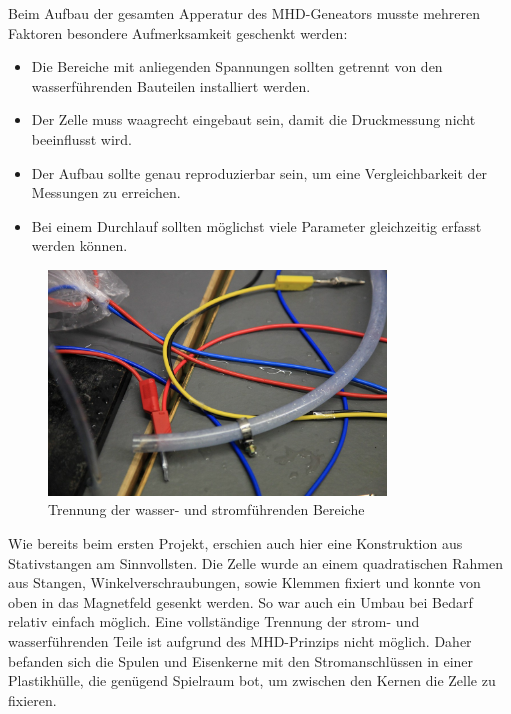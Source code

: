 \documentclass[11pt]{scrartcl}
\begin{document}
Beim Aufbau der gesamten Apperatur des MHD-Geneators musste mehreren Faktoren besondere Aufmerksamkeit geschenkt werden: 
\begin{itemize}
	\item Die Bereiche mit anliegenden Spannungen sollten getrennt von den wasserf\"uhrenden Bauteilen installiert werden. 
	\item Der Zelle muss waagrecht eingebaut sein, damit die Druckmessung nicht beeinflusst wird.
	\item Der Aufbau sollte genau reproduzierbar sein, um eine Vergleichbarkeit der Messungen zu erreichen.
	\item Bei einem Durchlauf sollten m\"oglichst viele Parameter gleichzeitig erfasst werden k\"onnen.
\end{itemize} 

\begin{figure}[ht]
\begin{center}
\includegraphics[width=0.8\textwidth]{images/wasser-strom1.jpg}
\end{center}
\vspace{-1.5\baselineskip}
\caption{Trennung der wasser- und stromf\"uhrenden Bereiche}
\label{wasser-strom1}
\end{figure}

Wie bereits beim ersten Projekt, erschien auch hier eine Konstruktion aus Stativstangen am Sinnvollsten. Die Zelle wurde an einem quadratischen Rahmen aus Stangen, Winkelverschraubungen, sowie Klemmen fixiert und konnte von oben in das Magnetfeld gesenkt werden. So war auch ein Umbau bei Bedarf relativ einfach m\"oglich. Eine vollst\"andige Trennung der strom- und wasserf\"uhrenden Teile ist aufgrund des MHD-Prinzips nicht m\"oglich. Daher befanden sich die Spulen und Eisenkerne mit den Stromanschl\"ussen in einer Plastikh\"ulle, die gen\"ugend Spielraum bot, um zwischen den Kernen die Zelle zu fixieren. 
\end{document}
